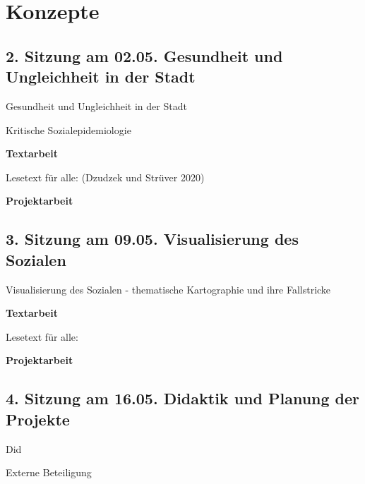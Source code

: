 \documentclass[
  ngerman,
]{article}
\begin{document}
\hypertarget{konzepte}{%
\section*{Konzepte}\label{konzepte}}

\hypertarget{sitzung-am-02.05.-gesundheit-und-ungleichheit-in-der-stadt}{%
\subsection*{2. Sitzung am 02.05. \textbar{} Gesundheit und Ungleichheit in der Stadt}\label{sitzung-am-02.05.-gesundheit-und-ungleichheit-in-der-stadt}}

Gesundheit und Ungleichheit in der Stadt

Kritische Sozialepidemiologie

\textbf{Textarbeit}

Lesetext für alle: (Dzudzek und Strüver 2020)

\textbf{Projektarbeit}

\hypertarget{sitzung-am-09.05.-visualisierung-des-sozialen}{%
\subsection*{3. Sitzung am 09.05. \textbar{} Visualisierung des Sozialen}\label{sitzung-am-09.05.-visualisierung-des-sozialen}}

Visualisierung des Sozialen - thematische Kartographie und ihre Fallstricke

\textbf{Textarbeit}

Lesetext für alle:

\textbf{Projektarbeit}

\hypertarget{sitzung-am-16.05.-didaktik-und-planung-der-projekte}{%
\subsection*{4. Sitzung am 16.05. \textbar{} Didaktik und Planung der Projekte}\label{sitzung-am-16.05.-didaktik-und-planung-der-projekte}}

Did

Externe Beteiligung
\end{document}
